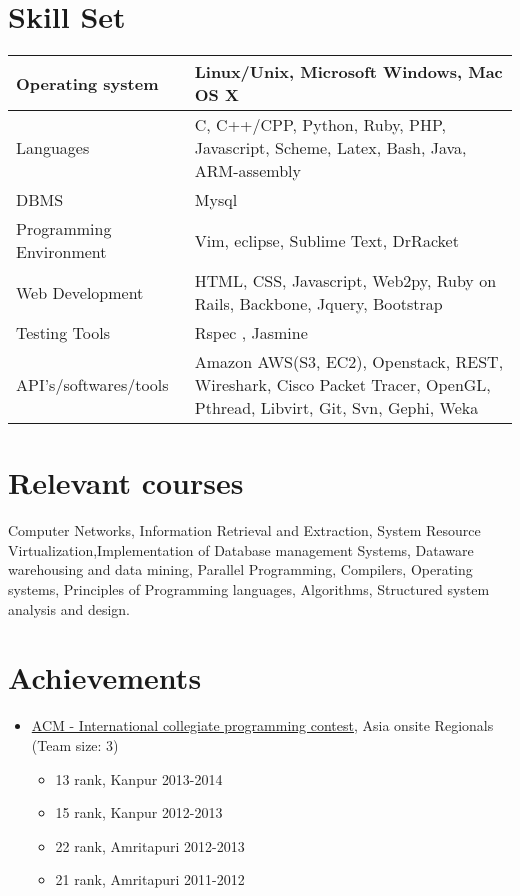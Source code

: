 \documentclass[margin]{res}
\begin{document}
\begin{resume}
\section{
Skill Set}

\begin{table}[htbp]
\begin{tabular}[ht]{|l | p{7cm} |}
\hline
Operating system & Linux/Unix, Microsoft Windows, Mac OS X \\
\hline
Languages & C, C++/CPP, Python, Ruby, PHP, Javascript, Scheme, Latex, Bash, Java, ARM-assembly \\
\hline
DBMS & Mysql \\
\hline
Programming Environment & Vim, eclipse, Sublime Text, DrRacket \\
\hline
Web Development & HTML, CSS, Javascript, Web2py, Ruby on Rails, Backbone, Jquery, Bootstrap \\
\hline
Testing Tools & Rspec , Jasmine \\
\hline
API's/softwares/tools
& Amazon AWS(S3, EC2),
Openstack, REST, Wireshark, Cisco Packet Tracer,
OpenGL, Pthread, Libvirt, Git, Svn, Gephi, Weka \\
\hline

\end{tabular}
\end{table}

\section{Relevant courses}
Computer Networks, Information Retrieval and Extraction, System Resource Virtualization,Implementation of Database management Systems, Dataware warehousing and data mining, Parallel Programming, Compilers, Operating systems, Principles of Programming languages, Algorithms, Structured system analysis and design. 

\section{Achievements}

\begin{itemize}
\item
	\hypersetup{urlcolor=black}	
	\href{http://icpc.baylor.edu/}{ACM - International collegiate programming contest}, Asia onsite Regionals \\
	\hypersetup{urlcolor=blue}
	{(Team size: 3)}
	\begin{itemize}
    \item 13 rank, Kanpur     \hfill{2013-2014}
		\item 15 rank, Kanpur     \hfill{2012-2013} 
		\item 22 rank, Amritapuri \hfill{2012-2013}
		\item 21 rank, Amritapuri \hfill{2011-2012} 
	\end{itemize}	 


\end{itemize}
\end{resume}
\end{document}
